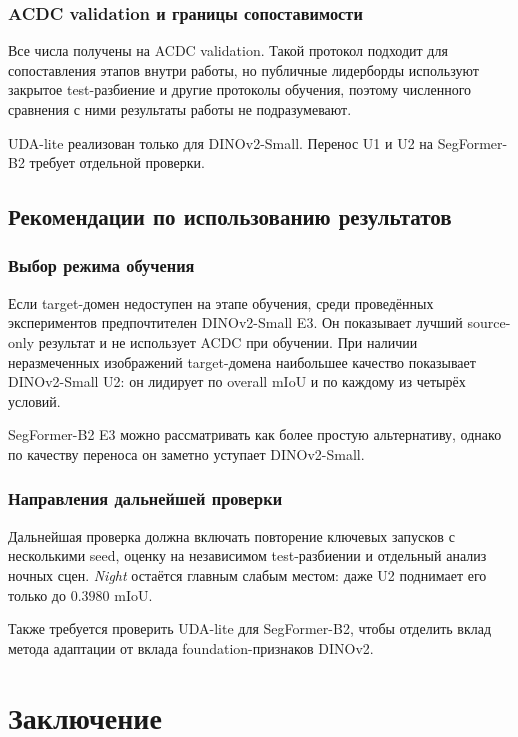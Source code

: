 \documentclass[14pt,a4paper]{extarticle}
\begin{document}
\subsubsection{ACDC validation и границы сопоставимости}

Все числа получены на ACDC validation. Такой протокол подходит для сопоставления этапов внутри работы, но публичные лидерборды используют закрытое test-разбиение и другие протоколы обучения, поэтому численного сравнения с ними результаты работы не подразумевают.

UDA-lite реализован только для DINOv2-Small. Перенос U1 и U2 на SegFormer-B2 требует отдельной проверки.

\subsection{Рекомендации по использованию результатов}

\subsubsection{Выбор режима обучения}

Если target-домен недоступен на этапе обучения, среди проведённых экспериментов предпочтителен DINOv2-Small E3. Он показывает лучший source-only результат и не использует ACDC при обучении. При наличии неразмеченных изображений target-домена наибольшее качество показывает DINOv2-Small U2: он лидирует по overall mIoU и по каждому из четырёх условий.

SegFormer-B2 E3 можно рассматривать как более простую альтернативу, однако по качеству переноса он заметно уступает DINOv2-Small.

\subsubsection{Направления дальнейшей проверки}

Дальнейшая проверка должна включать повторение ключевых запусков с несколькими seed, оценку на независимом test-разбиении и отдельный анализ ночных сцен. \textit{Night} остаётся главным слабым местом: даже U2 поднимает его только до $0.3980$ mIoU.

Также требуется проверить UDA-lite для SegFormer-B2, чтобы отделить вклад метода адаптации от вклада foundation-признаков DINOv2.

\newpage

\section*{Заключение}
\end{document}
